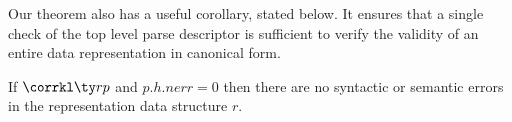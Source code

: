 Our theorem also has a useful corollary, stated below.  It ensures
that a single check of the top level parse descriptor 
is sufficient to verify the validity of an entire data 
representation in canonical form. 

\begin{corollary}
  If $\corrkl \ty r p$ and $p.h.nerr = 0$ then there are no syntactic
  or semantic errors in the representation data structure $r$.
\end{corollary}

